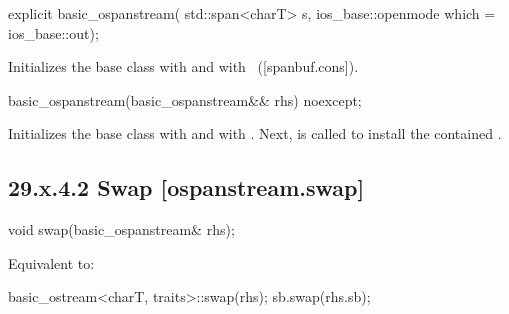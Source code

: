 \documentclass[ebook,11pt,article]{memoir}
\renewcommand{\iref}[1]{[#1]}
\begin{document}
\begin{itemdecl}
explicit basic_ospanstream(
  std::span<charT> s,
  ios_base::openmode which = ios_base::out);
\end{itemdecl}

\begin{itemdescr}
\pnum
\effects
Initializes the base class with
and  with
~(\iref{spanbuf.cons}).
\end{itemdescr}

\begin{itemdecl}
basic_ospanstream(basic_ospanstream&& rhs) noexcept;
\end{itemdecl}

\begin{itemdescr}
\pnum
\effects 
Initializes the base class with  
and  with .
Next,  is called to
install the contained .
\end{itemdescr}

\subsection{29.x.4.2 Swap [ospanstream.swap]}
\label{ospanstream.swap}

%

\begin{itemdecl}
void swap(basic_ospanstream& rhs);
\end{itemdecl}

\begin{itemdescr}
\pnum
\effects Equivalent to:
\begin{codeblock}
    basic_ostream<charT, traits>::swap(rhs);
    sb.swap(rhs.sb);
\end{codeblock}
\end{itemdescr}
\end{document}
